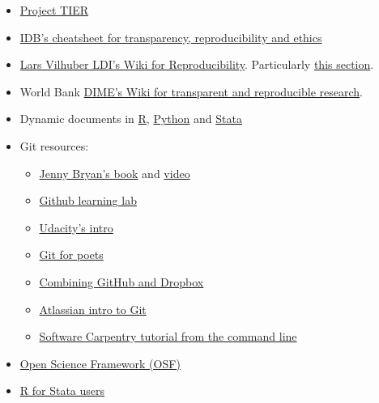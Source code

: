 \documentclass[]{book}
\providecommand{\tightlist}{%
  \setlength{\itemsep}{0pt}\setlength{\parskip}{0pt}}
\begin{document}
\begin{itemize}
\tightlist
\item
  \href{https://www.projecttier.org/tier-protocol/}{Project TIER}\\
\item
  \href{http://idbdocs.iadb.org/wsdocs/getdocument.aspx?docnum=EZSHARE-1350314980-383}{IDB's cheatsheet for transparency, reproducibility and ethics}\\
\item
  \href{https://github.com/labordynamicsinstitute/replicability-training/wiki}{Lars Vilhuber LDI's Wiki for Reproducibility}. Particularly \href{https://github.com/labordynamicsinstitute/replicability-training/wiki/Prepare_and_run_replication}{this section}.\\
\item
  World Bank \href{https://dimewiki.worldbank.org/wiki/Main_Page}{DIME's Wiki for transparent and reproducible research}.
\item
  Dynamic documents in \href{https://rmarkdown.rstudio.com/gallery.html}{R}, \href{https://github.com/jupyter/jupyter/wiki/A-gallery-of-interesting-Jupyter-Notebooks\#economics-and-finance}{Python} and \href{https://github.com/BITSS/CEGA2019/blob/master/03-extra_dynamic_docs/02b-Stata-markdown/Stata\%20Markdown.pdf}{Stata}\\
\item
  Git resources:

  \begin{itemize}
  \tightlist
  \item
    \href{https://happygitwithr.com}{Jenny Bryan's book} and \href{https://www.rstudio.com/resources/videos/happy-git-and-gihub-for-the-user-tutorial/}{video}\\
  \item
    \href{https://lab.github.com/}{Github learning lab}
  \item
    \href{https://www.udacity.com/course/how-to-use-git-and-github--ud775}{Udacity's intro}\\
  \item
    \href{https://www.youtube.com/playlist?list=PLRqwX-V7Uu6ZF9C0YMKuns9sLDzK6zoiV}{Git for poets}\\
  \item
    \href{https://github.com/kbjarkefur/GitHubDropBox}{Combining GitHub and Dropbox}\\
  \item
    \href{https://www.atlassian.com/git/tutorials}{Atlassian intro to Git}
  \item
    \href{https://swcarpentry.github.io/git-novice/}{Software Carpentry tutorial from the command line}
  \end{itemize}
\item
  \href{https://osf.io}{Open Science Framework (OSF)}
\item
  \href{https://github.com/hblackburn/R4Econ/blob/master/Resources.md}{R for Stata users}
\end{itemize}
\end{document}
